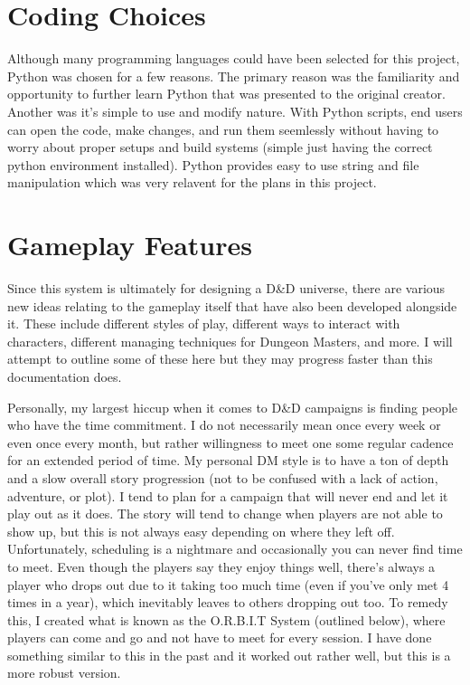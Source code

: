 \section{Coding Choices}

Although many programming languages could have been selected for this project, Python was chosen for a few reasons. The primary reason was the familiarity and opportunity to further learn Python that was presented to the original creator. Another was it's simple to use and modify nature. With Python scripts, end users can open the code, make changes, and run them seemlessly without having to worry about proper setups and build systems (simple just having the correct python environment installed). Python provides easy to use string and file manipulation which was very relavent for the plans in this project. 


\section{Gameplay Features}

Since this system is ultimately for designing a D\&D universe, there are various new ideas relating to the gameplay itself that have also been developed alongside it. These include different styles of play, different ways to interact with characters, different managing techniques for Dungeon Masters, and more. I will attempt to outline some of these here but they may progress faster than this documentation does.

Personally, my largest hiccup when it comes to D\&D campaigns is finding people who have the time commitment. I do not necessarily mean once every week or even once every month, but rather willingness to meet one some regular cadence for an extended period of time. My personal DM style is to have a ton of depth and a slow overall story progression (not to be confused with a lack of action, adventure, or plot). I tend to plan for a campaign that will never end and let it play out as it does. The story will tend to change when players are not able to show up, but this is not always easy depending on where they left off. Unfortunately, scheduling is a nightmare and occasionally you can never find time to meet. Even though the players say they enjoy things well, there's always a player who drops out due to it taking too much time (even if you've only met 4 times in a year), which inevitably leaves to others dropping out too. To remedy this, I created what is known as the O.R.B.I.T System (outlined below), where players can come and go and not have to meet for every session. I have done something similar to this in the past and it worked out rather well, but this is a more robust version.

